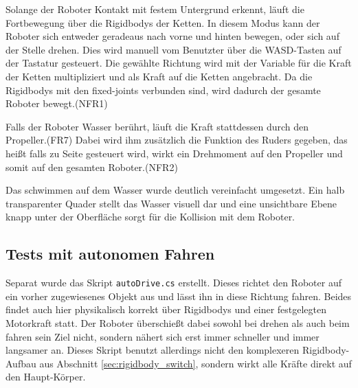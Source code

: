 Solange der Roboter Kontakt mit festem Untergrund erkennt, 
läuft die Fortbewegung über die Rigidbodys der Ketten.
In diesem Modus kann der Roboter sich entweder geradeaus nach vorne und hinten bewegen, 
oder sich auf der Stelle drehen.
Dies wird manuell vom Benutzter über die WASD-Tasten auf der Tastatur gesteuert.
Die gewählte Richtung wird mit der Variable für die Kraft der Ketten multipliziert 
und als Kraft auf die Ketten angebracht.
Da die Rigidbodys mit den fixed-joints verbunden sind, 
wird dadurch der gesamte Roboter bewegt.(NFR1)

Falls der Roboter Wasser berührt, läuft die Kraft stattdessen durch den Propeller.(FR7)
Dabei wird ihm zusätzlich die Funktion des Ruders gegeben,
das heißt falls zu Seite gesteuert wird,
wirkt ein Drehmoment auf den Propeller und somit auf den gesamten Roboter.(NFR2)

Das schwimmen auf dem Wasser wurde deutlich vereinfacht umgesetzt.
Ein halb transparenter Quader stellt das Wasser visuell dar
und eine unsichtbare Ebene knapp unter der Oberfläche 
sorgt für die Kollision mit dem Roboter.

\subsection{Tests mit autonomen Fahren}
Separat wurde das Skript \texttt{autoDrive.cs} erstellt. 
Dieses richtet den Roboter auf ein vorher zugewiesenes Objekt aus 
und lässt ihn in diese Richtung fahren.
Beides findet auch hier physikalisch korrekt über Rigidbodys 
und einer festgelegten Motorkraft statt.
Der Roboter überschießt dabei sowohl bei drehen als auch beim fahren sein Ziel nicht, 
sondern nähert sich erst immer schneller und immer langsamer an.
Dieses Skript benutzt allerdings nicht den komplexeren Rigidbody-Aufbau 
aus Abschnitt \ref{sec:rigidbody_switch}, 
sondern wirkt alle Kräfte direkt auf den Haupt-Körper.